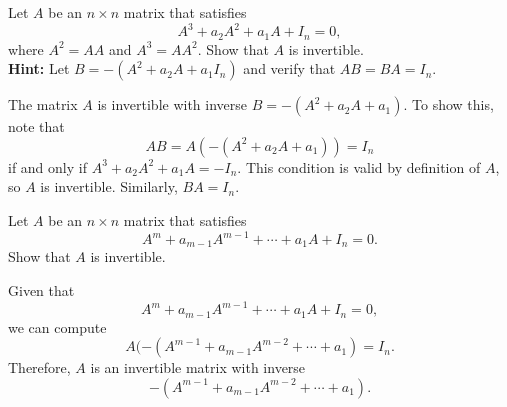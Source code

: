 \documentclass{ximera}
\begin{document}
\begin{exercise} \label{c4.8.5}
Let $A$ be an $n\times n$ matrix that satisfies
\[
A^3 + a_2A^2 + a_1A + I_n = 0,
\]
where $A^2=AA$ and $A^3=AA^2$.  Show that $A$ is invertible. \\
{\bf Hint:}  Let $B = -(A^2+a_2A+a_1I_n)$ and verify that $AB=BA=I_n$.

\begin{solution}

The matrix $A$ is invertible with inverse $B = -(A^2 + a_2A + a_1)$.
To show this, note that
\[ AB = A(-(A^2 + a_2A + a_1)) = I_n \]
if and only if $A^3 + a_2A^2 + a_1A = -I_n$.  This condition is valid
by definition of $A$, so $A$ is invertible.  Similarly, $BA = I_n$.

\end{solution}
\end{exercise}

\begin{exercise} \label{c4.8.6}
Let $A$ be an $n\times n$ matrix that satisfies
\[
A^m + a_{m-1}A^{m-1} + \cdots + a_1A + I_n = 0.
\]
Show that $A$ is invertible.

\begin{solution}

Given that
\[
A^m + a_{m - 1}A^{m - 1} + \cdots + a_1A + I_n = 0,
\]
we can compute
\[
A(-(A^{m - 1} + a_{m - 1}A^{m - 2} + \cdots + a_1) = I_n.
\]
Therefore, $A$ is an invertible matrix with inverse
\[
-(A^{m - 1} + a_{m - 1}A^{m - 2} + \cdots + a_1).
\]

\end{solution}
\end{exercise}
\end{document}
